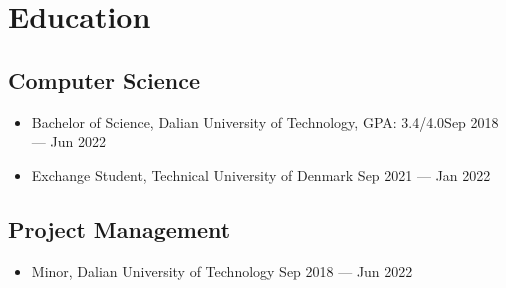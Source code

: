 \documentclass[a4,10pt]{article}
\newcommand{\subtext}[1]{
#1\par\vspace{-0.2cm}}
\newenvironment{zitemize}{
\begin{itemize}\itemsep0pt \parskip0pt \parsep1pt}
{\end{itemize}\vspace{-0.5cm}}
\begin{document}




\section{Education}

\subsection*{Computer Science}
\begin{zitemize}
    \item
        \subtext{Bachelor of Science, Dalian University of Technology, GPA: 3.4/4.0\hfill Sep 2018 --- Jun 2022}
        \vspace{0.1cm}
    \item
        \subtext{Exchange Student, Technical University of Denmark \hfill Sep 2021 --- Jan 2022}
        \vspace{0.1cm}
\end{zitemize}

\subsection*{Project Management}
\begin{zitemize}
    \item
        \subtext{Minor, Dalian University of Technology \hfill Sep 2018 --- Jun 2022}
        \vspace{0.1cm}
\end{zitemize}
\end{document}
